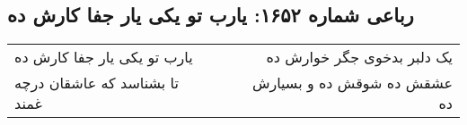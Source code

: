 \begin{center}
\section*{رباعی شماره ۱۶۵۲: یارب تو یکی یار جفا کارش ده}
\label{sec:1652}
\begin{longtable}{l p{0.5cm} r}
یارب تو یکی یار جفا کارش ده
&&
یک دلبر بدخوی جگر خوارش ده
\\
تا بشناسد که عاشقان درچه غمند
&&
عشقش ده شوقش ده و بسیارش ده
\\
\end{longtable}
\end{center}
